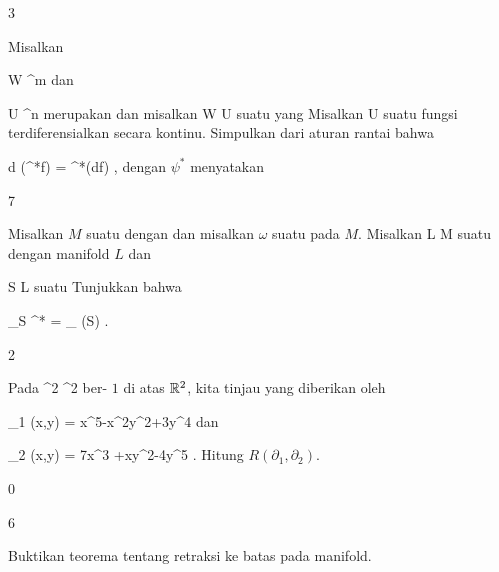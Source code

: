 {3}
{

Misalkan

\mavergleichskette
{\vergleichskette
{ W
}
{ \subseteq }{ \R^m
}
{  }{
}
{    }{
}
{   }{
}
}
{}{}{}
dan

\mavergleichskette
{\vergleichskette
{ U
}
{ \subseteq }{ \R^n
}
{  }{
}
{    }{
}
{   }{
}
}
{}{}{}
merupakan
dan misalkan
\maabbdisp {\psi} { W } { U
} {}
suatu
yang
Misalkan
 { U } {\R
} {}
suatu fungsi terdiferensialkan secara kontinu. Simpulkan dari
aturan rantai
bahwa

\mavergleichskettedisp
{\vergleichskette
{ d (\psi^*f)
}
{ =} { \psi^*(df)
}
{ } {
}
{ } {
}
{ } {
}
}
{}{}{,}
dengan $\psi^*$ menyatakan

}
{} {}

{7}
{

Misalkan $M$ suatu
dengan
dan misalkan $\omega$ suatu
pada $M$. Misalkan
\maabbdisp {\varphi} { L } { M
} {}
suatu
dengan manifold $L$ dan

\mavergleichskette
{\vergleichskette
{ S
}
{ \subseteq }{ L
}
{  }{
}
{    }{
}
{   }{
}
}
{}{}{}
suatu
Tunjukkan bahwa

\mavergleichskettedisp
{\vergleichskette
{ \int_S \varphi^* \omega
}
{ =} { \int_{ \varphi(S)} \omega
}
{ } {
}
{ } {
}
{ } {
}
}
{}{}{.}

}
{} {}

{2}
{

Pada
 {\R^2 \times \R} { \R^2
} {}
ber-
$1$ di atas ${\mathbb R}^2$, kita tinjau
yang diberikan oleh

\mavergleichskette
{\vergleichskette
{ \Gamma_1 (x,y)
}
{ = }{ x^5-x^2y^2+3y^4
}
{  }{
}
{    }{
}
{   }{
}
}
{}{}{}
dan

\mavergleichskette
{\vergleichskette
{ \Gamma_2 (x,y)
}
{ = }{ 7x^3 +xy^2-4y^5
}
{  }{
}
{    }{
}
{   }{
}
}
{}{}{.}
Hitung
$R \left(  \partial_1, \partial_2  \right)$.

}
{} {}

{0}
{

}
{} {}

{6}
{

Buktikan teorema tentang retraksi ke batas pada manifold.

}
{} {}
